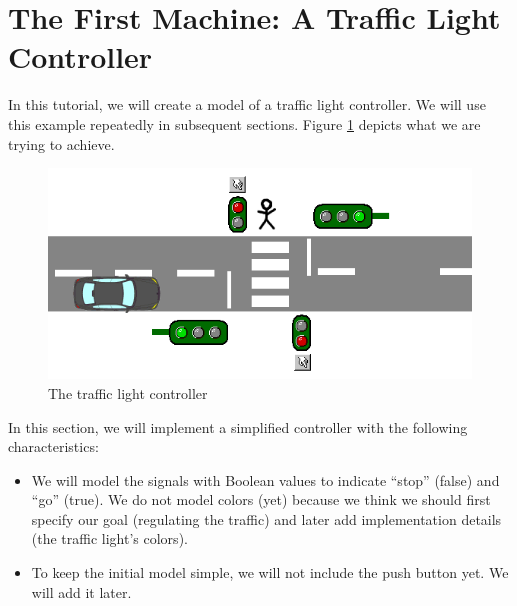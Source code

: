 \section{The First Machine: A Traffic Light Controller}
\label{tut_first_machine}



In this tutorial, we will create a model of a traffic light controller.  We will use this example repeatedly in subsequent sections.  Figure \ref{fig_tut_03_traffic_light} depicts what we are trying to achieve.


\begin{figure}[!ht]
\begin{center}
	\includegraphics[]{img/tutorial/tut_03_trafficlight.png}
	\caption{The traffic light controller}
	\label{fig_tut_03_traffic_light}
\end{center}
\end{figure}

In this section, we will implement a simplified controller with the following characteristics:
\begin{itemize}
	\item We will model the signals with Boolean values to indicate ``stop'' (false) and ``go'' (true).  We do not model colors (yet) because
      we think we should first specify our goal (regulating the traffic) and later add implementation details (the traffic light's colors).
	\item To keep the initial model simple, we will not include the push button yet. We will add it later.
\end{itemize}

